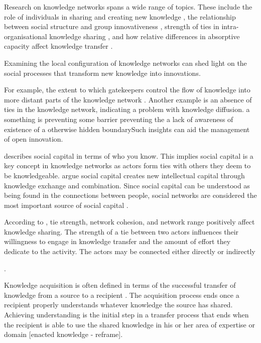 Research on knowledge networks spans a wide range of topics. These include the role of individuals in sharing and creating new knowledge \citep[e.g.][]{burt2004structural,grigoriou2014structural,perry2014social}, the relationship between social structure and group innovativeness \citep[e.g.][]{reagans2001networks,reagans2003network,jansen2006exploratory}, strength of ties in intra-organisational knowledge sharing \citep{hansen1999search}, and how relative differences in absorptive capacity affect knowledge transfer \citep[e.g.][]{lane1998relative,nooteboom2000learning}. 



Examining the local configuration of knowledge networks can shed light on the social processes that transform new knowledge into innovations. 

For example, the extent to which gatekeepers control the flow of knowledge into more distant parts of the knowledge network \citep{allen1977role}. Another example is an absence of ties in the knowledge network, indicating a problem with knowledge diffusion.  a something is preventing some barrier preventing   the a lack of awareness of existence of a otherwise hidden boundarySuch insights can aid the management of open innovation. \medskip



\citet{burt1997contingent} describes social capital in terms of who you know. This implies social capital is a key concept in knowledge networks as actors form ties with others they deem to be knowledgeable. \citet{nahapiet1998social} argue social capital creates new intellectual capital through knowledge exchange and combination. Since social capital can be understood as being found in the connections between people, social networks are considered the most important source of social capital \citep{adler2002social}.

 

According to \citet{tortoriello2012bridging}, tie strength, network cohesion, and network range positively affect knowledge sharing. The strength of a tie between two actors influences their willingness to engage in knowledge transfer and the amount of effort they dedicate to the activity. The actors may be connected either directly or indirectly  

 \citep{tortoriello2012bridging}.


Knowledge acquisition is often defined in terms of the successful transfer of knowledge from a source to a recipient \citep{reagans2003network}. The acquisition process ends once a recipient properly understands whatever knowledge the source has shared. Achieving understanding is the initial step in a transfer process that ends when the recipient is able to use the shared knowledge in his or her area of expertise or domain [enacted knowledge - reframe].

